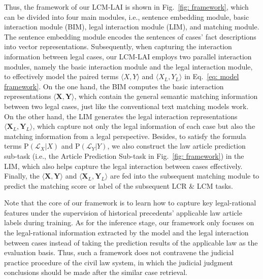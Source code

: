 Thus, the framework of our LCM-LAI is shown in Fig.~\ref{fig: framework}, which can be divided into four main modules, i.e., sentence embedding module, basic interaction module (BIM), legal interaction module (LIM), and matching module.
The sentence embedding module encodes the sentences of cases' fact descriptions into vector representations.
Subsequently, when capturing the interaction information between legal cases, our LCM-LAI employs two parallel interaction modules, namely the basic interaction module and the legal interaction module, to effectively model the paired terms $\langle X, Y \rangle$ and $\langle X_L, Y_L \rangle$ in Eq.~\ref{eq: model framework}.
On the one hand, the BIM computes the basic interaction representations $\langle \mathbf{X}, \mathbf{Y} \rangle$, which contain the general semantic matching information between two legal cases, just like the conventional text matching models work.
On the other hand, the LIM generates the legal interaction representations $\langle \mathbf{X}_L, \mathbf{Y}_L \rangle$, which capture not only the legal information of each case but also the matching information from a legal perspective.
Besides, to satisfy the formula terms $\mathrm{P}(\mathcal{L}_X|X)$ and $\mathrm{P}(\mathcal{L}_Y|Y)$, we also construct the law article prediction sub-task (i.e., the Article Prediction Sub-task in Fig.~\ref{fig: framework}) in the LIM, which also helps capture the legal interaction between cases effectively.
Finally, the $\langle \mathbf{X}, \mathbf{Y} \rangle$ and $\langle \mathbf{X}_L, \mathbf{Y}_L \rangle$ are fed into the subsequent matching module to predict the matching score or label of the subsequent LCR \& LCM tasks.

Note that the core of our framework is to learn how to capture key legal-rational features under the supervision of historical precedents' applicable law article labels during training. 
As for the inference stage, our framework only focuses on the legal-rational information extracted by the model and the legal interaction between cases instead of taking the prediction results of the applicable law as the evaluation basis.
Thus, such a framework does not contravene the judicial practice procedure of the civil law system, in which the judicial judgment conclusions should be made after the similar case retrieval.
